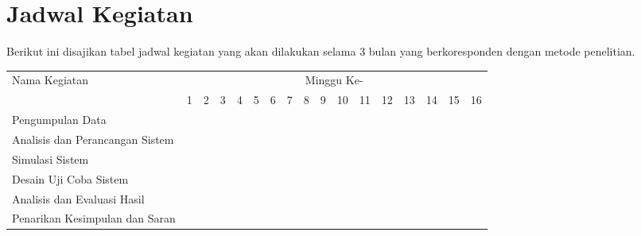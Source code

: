 \section{Jadwal Kegiatan}
Berikut ini disajikan tabel jadwal kegiatan yang akan dilakukan selama 3 bulan yang berkoresponden dengan metode penelitian.
\newcommand{\w}{}
\newcommand{\G}{\cellcolor{gray}}
\begin{table}[h!]
  \begin{tabular}{|p{3.5cm}|c|c|c|c|c|c|c|c|c|c|c|c|c|c|c|c|}

    \hline
    \multirow{2}{*}{Nama Kegiatan} & \multicolumn{16}{|c|}{Minggu Ke-} \\
    \cline{2-17} &
    1 & 2 & 3 & 4 & 5 & 6 & 7 & 8 & 9 & 10 & 11 & 12 & 13 & 14 & 15 & 16 \\
    \hline

    Pengumpulan Data &
    \G & \G & \w & \w & \w & \w & \w & \w & \w & \w & \w & \w & \w & \w & \w & \w \\
    \hline

    Analisis dan Perancangan Sistem &
    \w & \w & \G & \G & \G & \G & \G & \G & \G & \w & \w & \w & \w & \w & \w & \w \\
    \hline
    
    Simulasi Sistem &
    \w & \w & \w & \w & \w & \w & \w & \w & \w & \G & \w & \w & \w & \w & \w & \w \\
    \hline
    
    Desain Uji Coba Sistem &
    \w & \w & \w & \w & \w & \w & \w & \w & \w & \w & \G & \w & \w & \w & \w & \w \\
    \hline

    Analisis dan Evaluasi Hasil&
    \w & \w & \w & \w & \w & \w & \w & \w & \w & \w & \w & \G & \G & \G & \w & \w \\
    \hline
    
    Penarikan Kesimpulan dan Saran &
    \w & \w & \w & \w & \w & \w & \w & \w & \w & \w & \w & \w & \w & \w & \G & \G \\
    \hline

  \end{tabular}
\end{table}

\newpage
